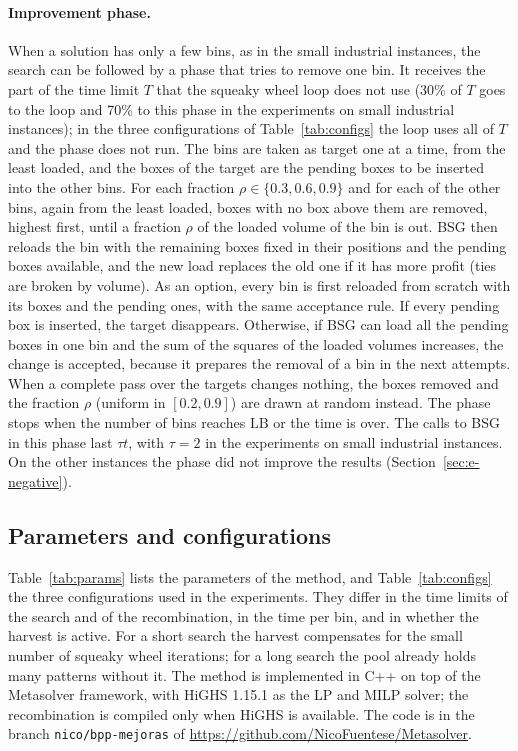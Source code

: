 \paragraph{Improvement phase.}
When a solution has only a few bins, as in the small industrial instances, the search can be
followed by a phase that tries to remove one bin. It receives the part of the time limit $T$ that
the squeaky wheel loop does not use (30\% of $T$ goes to the loop and 70\% to this phase in the
experiments on small industrial instances); in the three configurations of Table~\ref{tab:configs}
the loop uses all of $T$ and the phase does not run. The bins are taken as target one at a time,
from the least loaded, and the boxes of the target are the pending boxes to be inserted into the
other bins. For each fraction $\rho\in\{0.3,0.6,0.9\}$ and for each of the other bins, again from
the least loaded, boxes with no box above them are removed, highest first, until a fraction $\rho$
of the loaded volume of the bin is out. BSG then reloads the bin with the remaining boxes fixed in
their positions and the pending boxes available, and the new load replaces the old one if it has
more profit (ties are broken by volume). As an option, every bin is first reloaded from scratch with
its boxes and the pending ones, with the same acceptance rule. If every pending box is inserted, the
target disappears. Otherwise, if BSG can load all the pending boxes in one bin and the sum of the
squares of the loaded volumes increases, the change is accepted, because it prepares the removal of
a bin in the next attempts. When a complete pass over the targets changes nothing, the boxes
removed and the fraction $\rho$ (uniform in $[0.2,0.9]$) are drawn at random instead. The phase
stops when the number of bins reaches $\mathrm{LB}$ or the time is over. The calls to BSG in this
phase last $\tau t$, with $\tau=2$ in the experiments on small industrial instances. On the other
instances the phase did not improve the results (Section~\ref{sec:e-negative}).

\subsection{Parameters and configurations}
\label{sec:m-params}

Table~\ref{tab:params} lists the parameters of the method, and Table~\ref{tab:configs} the three
configurations used in the experiments. They differ in the time limits of the search and of the
recombination, in the time per bin, and in whether the harvest is active. For a short search the
harvest compensates for the small number of squeaky wheel iterations; for a long search the
pool already holds many patterns without it. The method is implemented in C++ on top of the
Metasolver framework, with HiGHS 1.15.1 as the LP and MILP solver; the recombination is
compiled only when HiGHS is available. The code is in the branch \texttt{nico/bpp-mejoras} of \url{https://github.com/NicoFuentese/Metasolver}.

